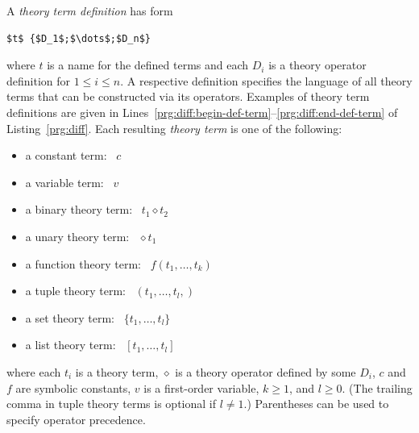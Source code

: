 \documentclass[a4paper,USenglish]{oasics-v2016}
\begin{document}
A \emph{theory term definition} has form
\begin{lstlisting}[numbers=none,mathescape=t]
$t$ {$D_1$;$\dots$;$D_n$}
\end{lstlisting}
where $t$ is a name for the defined terms and each $D_i$ is a theory operator definition 
for $1\leq i\leq n$.
A respective definition specifies the language of all theory terms
that can be constructed via %
its operators. %
%
Examples of theory term definitions are given in Lines~\ref{prg:diff:begin-def-term}--\ref{prg:diff:end-def-term} of Listing~\ref{prg:diff}.
%
Each resulting \emph{theory term} is one of the following:
\par\medskip\noindent
\begin{minipage}{0.5\linewidth}
  \begin{itemize}
  \item a constant term: \ $c$
  \item a variable term: \ $v$
  \item a binary theory term: \  $t_1 \diamond t_2$
  \item a unary theory term: \  ${}\diamond t_1$
  \end{itemize}
\end{minipage}
\begin{minipage}{0.5\linewidth}
\begin{itemize}
  \item a function theory term: \  $f(t_1,\dots,t_k)$
  \item a tuple theory term: \  $(t_1,\dots,t_l,)$
  \item a set theory term: \  $\{t_1,\dots,t_l\}$
  \item a list theory term: \  $[t_1,\dots,t_l]$
\end{itemize}
\end{minipage}
\par\medskip\noindent
where each $t_i$ is a theory term,
$\diamond$ is a theory operator defined by some $D_i$,
$c$ and $f$ are symbolic constants,
$v$ is a first-order variable,
$k\geq 1$, and
$l\geq 0$.
(The trailing comma in tuple theory terms is optional if $l \neq 1$.)
%
Parentheses can be used to specify operator precedence.
\end{document}
